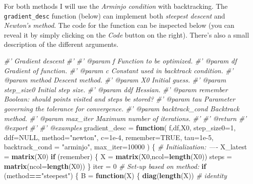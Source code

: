 \documentclass[
]{book}
\newenvironment{Shaded}{\begin{snugshade}}{\end{snugshade}}
\newcommand{\CommentTok}[1]{\textcolor[rgb]{0.56,0.35,0.01}{\textit{#1}}}
\newcommand{\ControlFlowTok}[1]{\textcolor[rgb]{0.13,0.29,0.53}{\textbf{#1}}}
\newcommand{\DataTypeTok}[1]{\textcolor[rgb]{0.13,0.29,0.53}{#1}}
\newcommand{\DecValTok}[1]{\textcolor[rgb]{0.00,0.00,0.81}{#1}}
\newcommand{\FloatTok}[1]{\textcolor[rgb]{0.00,0.00,0.81}{#1}}
\newcommand{\KeywordTok}[1]{\textcolor[rgb]{0.13,0.29,0.53}{\textbf{#1}}}
\newcommand{\NormalTok}[1]{#1}
\newcommand{\OperatorTok}[1]{\textcolor[rgb]{0.81,0.36,0.00}{\textbf{#1}}}
\newcommand{\OtherTok}[1]{\textcolor[rgb]{0.56,0.35,0.01}{#1}}
\newcommand{\StringTok}[1]{\textcolor[rgb]{0.31,0.60,0.02}{#1}}
\begin{document}
For both methods I will use the \emph{Arminjo condition} with backtracking. The \texttt{gradient\_desc} function (below) can implement both \emph{steepest descent} and \emph{Newton's method}. The code for the function can be inspected below (you can reveal it by simply clicking on the \emph{Code} button on the right). There's also a small description of the different arguments.

\begin{Shaded}
\begin{Highlighting}[]
\CommentTok{#' Gradient descent}
\CommentTok{#'}
\CommentTok{#' @param f Function to be optimized.}
\CommentTok{#' @param df Gradient of function.}
\CommentTok{#' @param c Constant used in backtrack condition.}
\CommentTok{#' @param method Descent method.}
\CommentTok{#' @param X0 Initial guess.}
\CommentTok{#' @param step_size0 Initial step size.}
\CommentTok{#' @param ddf Hessian.}
\CommentTok{#' @param remember Boolean: should points visited and steps be stored?}
\CommentTok{#' @param tau Parameter governing the tolerance for convergence.}
\CommentTok{#' @param backtrack_cond Backtrack method.}
\CommentTok{#' @param max_iter Maximum number of iterations.}
\CommentTok{#'}
\CommentTok{#' @return}
\CommentTok{#' @export}
\CommentTok{#'}
\CommentTok{#' @examples}
\NormalTok{gradient_desc =}\StringTok{ }\ControlFlowTok{function}\NormalTok{(}
\NormalTok{  f,df,X0,}
  \DataTypeTok{step_size0=}\DecValTok{1}\NormalTok{,}
  \DataTypeTok{ddf=}\OtherTok{NULL}\NormalTok{,}
  \DataTypeTok{method=}\StringTok{"newton"}\NormalTok{,}
  \DataTypeTok{c=}\FloatTok{1e-4}\NormalTok{,}
  \DataTypeTok{remember=}\OtherTok{TRUE}\NormalTok{,}
  \DataTypeTok{tau=}\FloatTok{1e-5}\NormalTok{,}
  \DataTypeTok{backtrack_cond =} \StringTok{"arminjo"}\NormalTok{,}
  \DataTypeTok{max_iter=}\DecValTok{10000}
\NormalTok{) \{}
  \CommentTok{# Initialization: ----}
\NormalTok{  X_latest =}\StringTok{ }\KeywordTok{matrix}\NormalTok{(X0)}
  \ControlFlowTok{if}\NormalTok{ (remember) \{}
\NormalTok{    X =}\StringTok{ }\KeywordTok{matrix}\NormalTok{(X0,}\DataTypeTok{ncol=}\KeywordTok{length}\NormalTok{(X0))}
\NormalTok{    steps =}\StringTok{ }\KeywordTok{matrix}\NormalTok{(}\DataTypeTok{ncol=}\KeywordTok{length}\NormalTok{(X0))}
\NormalTok{  \}}
\NormalTok{  iter =}\StringTok{ }\DecValTok{0}
  \CommentTok{# Set-up based on method:}
  \ControlFlowTok{if}\NormalTok{ (method}\OperatorTok{==}\StringTok{"steepest"}\NormalTok{) \{}
\NormalTok{    B =}\StringTok{ }\ControlFlowTok{function}\NormalTok{(X) \{}
      \KeywordTok{diag}\NormalTok{(}\KeywordTok{length}\NormalTok{(X)) }\CommentTok{# identity}

\end{Highlighting}
\end{Shaded}
\end{document}
